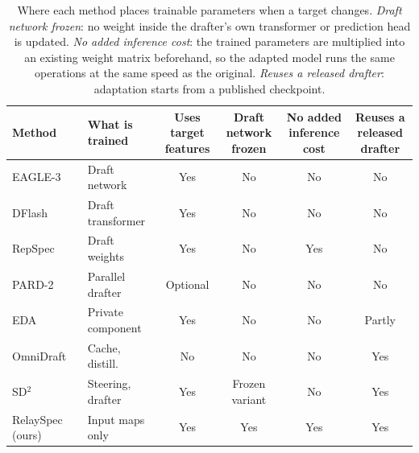 \begin{table}[t]
\centering
\caption{Where each method places trainable parameters when a target changes. \emph{Draft network frozen}: no weight inside the drafter's own transformer or prediction head is updated. \emph{No added inference cost}: the trained parameters are multiplied into an existing weight matrix beforehand, so the adapted model runs the same operations at the same speed as the original. \emph{Reuses a released drafter}: adaptation starts from a published checkpoint.}
\label{tab:related}
\setlength{\tabcolsep}{3pt}
\scriptsize
\begin{tabular}{llcccc}
\toprule
Method & What is trained & \shortstack{Uses target\\features} & \shortstack{Draft network\\frozen} & \shortstack{No added\\inference cost} & \shortstack{Reuses a\\released drafter} \\
\midrule
EAGLE-3~\citep{li2025eagle3} & Draft network & Yes & No & No & No \\
DFlash~\citep{chen2026dflash} & Draft transformer & Yes & No & No & No \\
RepSpec~\citep{huo2026repspec} & Draft weights & Yes & No & Yes & No \\
PARD-2~\citep{an2026pard2} & Parallel drafter & Optional & No & No & No \\
EDA~\citep{lin2026eda} & Private component & Yes & No & No & Partly \\
OmniDraft~\citep{ramakrishnan2025omnidraft} & Cache, distill. & No & No & No & Yes \\
SD$^2$~\citep{berdoz2026steering} & Steering, drafter & Yes & Frozen variant & No & Yes \\
\midrule
RelaySpec (ours) & Input maps only & Yes & Yes & Yes & Yes \\
\bottomrule
\end{tabular}
\end{table}
